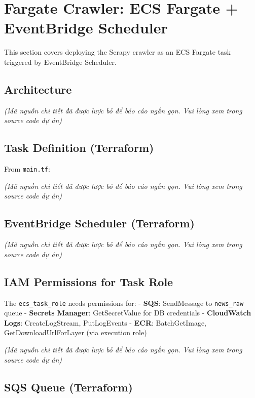 \hypertarget{fargate-crawler-ecs-fargate-eventbridge-scheduler}{%
\section{Fargate Crawler: ECS Fargate + EventBridge
Scheduler}}

This section covers deploying the Scrapy crawler as an ECS Fargate task
triggered by EventBridge Scheduler.

\hypertarget{architecture}{%
\subsection{Architecture}}

\emph{(Mã nguồn chi tiết đã được lược bỏ để báo cáo ngắn gọn. Vui lòng
xem trong source code dự án)}

\hypertarget{task-definition-terraform}{%
\subsection{Task Definition
(Terraform)}}

From \texttt{main.tf}:

\emph{(Mã nguồn chi tiết đã được lược bỏ để báo cáo ngắn gọn. Vui lòng
xem trong source code dự án)}

\hypertarget{eventbridge-scheduler-terraform}{%
\subsection{EventBridge Scheduler
(Terraform)}}

\emph{(Mã nguồn chi tiết đã được lược bỏ để báo cáo ngắn gọn. Vui lòng
xem trong source code dự án)}

\hypertarget{iam-permissions-for-task-role}{%
\subsection{IAM Permissions for Task
Role}}

The \texttt{ecs\_task\_role} needs permissions for: - \textbf{SQS}:
SendMessage to \texttt{news\_raw} queue - \textbf{Secrets Manager}:
GetSecretValue for DB credentials - \textbf{CloudWatch Logs}:
CreateLogStream, PutLogEvents - \textbf{ECR}: BatchGetImage,
GetDownloadUrlForLayer (via execution role)

\emph{(Mã nguồn chi tiết đã được lược bỏ để báo cáo ngắn gọn. Vui lòng
xem trong source code dự án)}

\hypertarget{sqs-queue-terraform}{%
\subsection{SQS Queue (Terraform)}}

